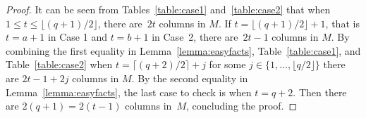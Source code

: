 \documentclass[11pt,a4paper]{article}
\theoremstyle{definition}
\begin{document}
\begin{proof}
\begin{table}
\parbox{.49\linewidth}{
\centering
{}
\caption{$q+1=2a$ is even.} \label{table:case1}
}
\hfill
\parbox{.49\linewidth}{
\centering
{}
\caption{$q+1=2b+1$ is odd.} \label{table:case2}
}
\end{table}

It can be seen from Tables~\ref{table:case1} and~\ref{table:case2} that when $1 \le t \le \lfloor (q+1)/2 \rfloor$, there are~$2t$ columns in $M$. If $t = \lfloor (q+1)/2 \rfloor + 1$, that is $t=a+1$ in Case 1 and $t=b+1$ in Case~2, there are~$2t-1$ columns in $M$. By combining the first equality in Lemma~\ref{lemma:easyfacts}, Table~\ref{table:case1}, and Table~\ref{table:case2} when $t = \lceil (q+2)/2 \rceil + j $ for some $j \in\{1,\ldots,\lfloor q/2 \rfloor\}$ there are $2t-1+2j$ columns in $M$. By the second equality in Lemma~\ref{lemma:easyfacts}, the last case to check is when $t=q+2$. Then there are $2(q+1) = 2(t-1)$ columns in~$M$, concluding the proof.
\end{proof}
\end{document}
